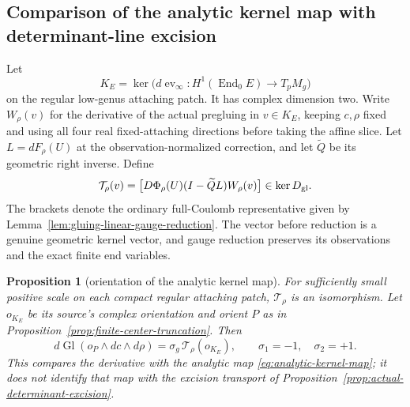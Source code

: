 \documentclass[11pt]{amsart}
\newtheorem{proposition}[theorem]{Proposition}
\theoremstyle{definition}
\theoremstyle{remark}
\theoremstyle{plain}
\begin{document}
\subsection{Comparison of the analytic kernel map with determinant-line excision}
\label{sec:analytic-kernel-orientation}

Let
\[
 K_E=\ker\bigl(d\operatorname{ev}_\infty:
          H^1(\operatorname{End}_0E)\longrightarrow T_pM_g\bigr)
\]
on the regular low-genus attaching patch. It has complex dimension two.
Write $W_\rho(v)$ for the derivative of the actual pregluing in
$v\in K_E$, keeping $c,\rho$ fixed and using all four real
fixed-attaching directions before taking the affine slice.
Let $L=dF_\rho(U)$ at the observation-normalized correction,
and let $\widetilde Q$ be its geometric right inverse. Define
\begin{equation}\label{eq:analytic-kernel-map}
 \mathcal T_\rho(v)
   =\bigl[D\Phi_\rho(U)(I-\widetilde QL)W_\rho(v)\bigr]
                                      \in\ker D_{\rm gl}.
\end{equation}
The brackets denote the ordinary full-Coulomb representative
given by Lemma~\ref{lem:gluing-linear-gauge-reduction}.
The vector before reduction is a genuine geometric kernel
vector, and gauge reduction preserves its observations and
the exact finite end variables.

\begin{proposition}[orientation of the analytic kernel map]
\label{prop:analytic-kernel-orientation}
For sufficiently small positive scale on each compact regular
attaching patch, $\mathcal T_\rho$ is an isomorphism.
Let $o_{K_E}$ be its source's complex orientation and orient $P$
as in Proposition~\ref{prop:finite-center-truncation}. Then
\begin{equation}\label{eq:analytic-gluing-orientation}
 d\operatorname{Gl}(o_P\wedge dc\wedge d\rho)
       =\sigma_g\,\mathcal T_\rho(o_{K_E}),\qquad
                  \sigma_1=-1,\quad \sigma_2=+1.
\end{equation}
This compares the derivative with the analytic map
\eqref{eq:analytic-kernel-map}; it does not identify that map
with the excision transport of
Proposition~\ref{prop:actual-determinant-excision}.
\end{proposition}
\end{document}

